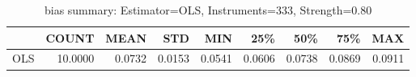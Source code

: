 \begin{table}[ht]
\centering
\caption{bias summary: Estimator=OLS, Instruments=333, Strength=0.80}
\begin{tabular}{lrrrrrrrr}
\toprule
 & COUNT & MEAN & STD & MIN & 25\% & 50\% & 75\% & MAX \\
\midrule
OLS & 10.0000 & 0.0732 & 0.0153 & 0.0541 & 0.0606 & 0.0738 & 0.0869 & 0.0911 \\
\bottomrule
\end{tabular}
\end{table}
